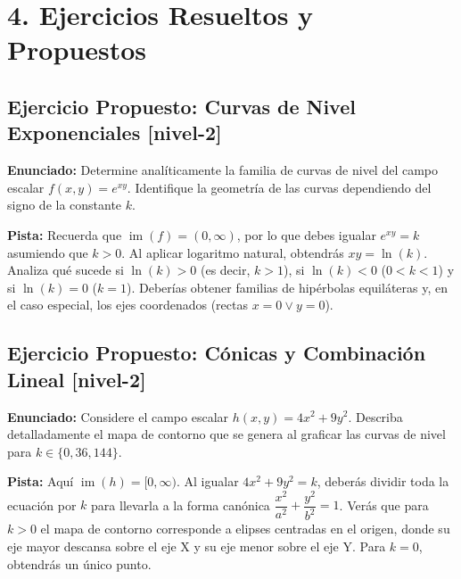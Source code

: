 \documentclass[11pt]{article}
\newenvironment{ejercicios}{%
  \section*{4. Ejercicios Resueltos y Propuestos}%
}{}
\newenvironment{ejerciciopropuesto}[2]{\subsection*{Ejercicio Propuesto: #1 \small{[#2]}}}{}
\newcommand{\enunciado}[1]{\textbf{Enunciado:} #1\par\vspace{0.2cm}}
\newcommand{\pista}[1]{\textbf{Pista:} #1\par\vspace{0.4cm}}
\begin{document}
\begin{ejercicios}
  \begin{ejerciciopropuesto}{Curvas de Nivel Exponenciales}{nivel-2}
    \enunciado{
      Determine analíticamente la familia de curvas de nivel del campo escalar $f(x,y) = e^{xy}$. Identifique la geometría de las curvas dependiendo del signo de la constante $k$.
    }
    \pista{
      Recuerda que $\operatorname{im}(f) = (0, \infty)$, por lo que debes igualar $e^{xy} = k$ asumiendo que $k > 0$. Al aplicar logaritmo natural, obtendrás $xy = \ln(k)$. 
      Analiza qué sucede si $\ln(k) > 0$ (es decir, $k > 1$), si $\ln(k) < 0$ ($0 < k < 1$) y si $\ln(k) = 0$ ($k = 1$). Deberías obtener familias de hipérbolas equiláteras y, en el caso especial, los ejes coordenados (rectas $x=0 \vee y=0$).
    }
  \end{ejerciciopropuesto}

  \begin{ejerciciopropuesto}{Cónicas y Combinación Lineal}{nivel-2}
    \enunciado{
      Considere el campo escalar $h(x,y) = 4x^2 + 9y^2$. Describa detalladamente el mapa de contorno que se genera al graficar las curvas de nivel para $k \in \{0, 36, 144\}$.
    }
    \pista{
      Aquí $\operatorname{im}(h) = [0, \infty)$. Al igualar $4x^2 + 9y^2 = k$, deberás dividir toda la ecuación por $k$ para llevarla a la forma canónica $\dfrac{x^2}{a^2} + \dfrac{y^2}{b^2} = 1$. Verás que para $k>0$ el mapa de contorno corresponde a elipses centradas en el origen, donde su eje mayor descansa sobre el eje X y su eje menor sobre el eje Y. Para $k=0$, obtendrás un único punto.
    }
  \end{ejerciciopropuesto}

\end{ejercicios}
\end{document}

